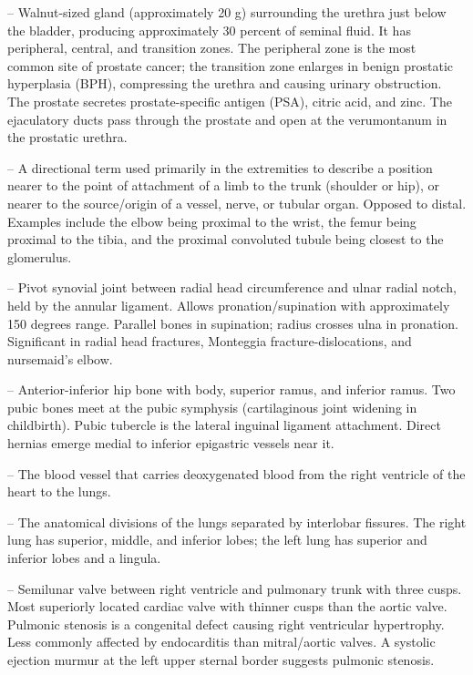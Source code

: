 -- Walnut-sized gland (approximately 20 g) surrounding the urethra just below the bladder, producing approximately 30 percent of seminal fluid. It has peripheral, central, and transition zones. The peripheral zone is the most common site of prostate cancer; the transition zone enlarges in benign prostatic hyperplasia (BPH), compressing the urethra and causing urinary obstruction. The prostate secretes prostate-specific antigen (PSA), citric acid, and zinc. The ejaculatory ducts pass through the prostate and open at the verumontanum in the prostatic urethra.

-- A directional term used primarily in the extremities to describe a position nearer to the point of attachment of a limb to the trunk (shoulder or hip), or nearer to the source/origin of a vessel, nerve, or tubular organ. Opposed to distal. Examples include the elbow being proximal to the wrist, the femur being proximal to the tibia, and the proximal convoluted tubule being closest to the glomerulus.

-- Pivot synovial joint between radial head circumference and ulnar radial notch, held by the annular ligament. Allows pronation/supination with approximately 150 degrees range. Parallel bones in supination; radius crosses ulna in pronation. Significant in radial head fractures, Monteggia fracture-dislocations, and nursemaid's elbow.

-- Anterior-inferior hip bone with body, superior ramus, and inferior ramus. Two pubic bones meet at the pubic symphysis (cartilaginous joint widening in childbirth). Pubic tubercle is the lateral inguinal ligament attachment. Direct hernias emerge medial to inferior epigastric vessels near it.

-- The blood vessel that carries deoxygenated blood from the right ventricle of the heart to the lungs.

-- The anatomical divisions of the lungs separated by interlobar fissures. The right lung has superior, middle, and inferior lobes; the left lung has superior and inferior lobes and a lingula.

-- Semilunar valve between right ventricle and pulmonary trunk with three cusps. Most superiorly located cardiac valve with thinner cusps than the aortic valve. Pulmonic stenosis is a congenital defect causing right ventricular hypertrophy. Less commonly affected by endocarditis than mitral/aortic valves. A systolic ejection murmur at the left upper sternal border suggests pulmonic stenosis.

